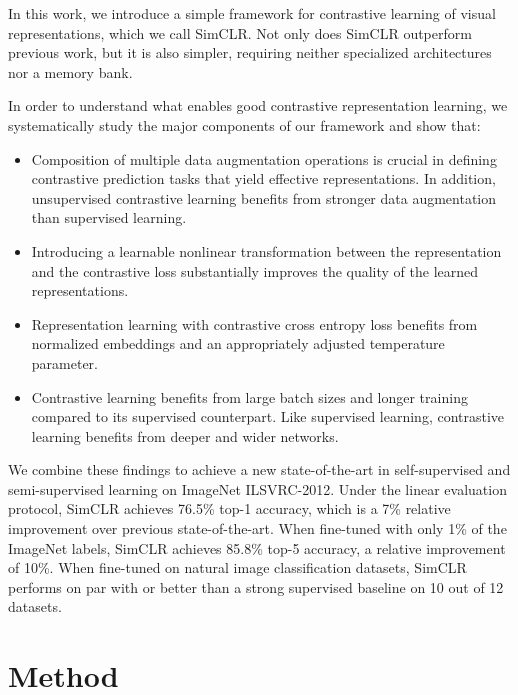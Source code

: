 \documentclass[conference]{IEEEtran}
\begin{document}
In this work, we introduce a simple framework for contrastive learning of visual representations, which we call SimCLR. Not only does SimCLR outperform previous work, but it is also simpler, requiring neither specialized architectures nor a memory bank.

In order to understand what enables good contrastive representation learning, we systematically study the major components of our framework and show that:
\begin{itemize}
    \item Composition of multiple data augmentation operations is crucial in defining contrastive prediction tasks that yield effective representations. In addition, unsupervised contrastive learning benefits from stronger data augmentation than supervised learning.
    \item Introducing a learnable nonlinear transformation between the representation and the contrastive loss substantially improves the quality of the learned representations.
    \item Representation learning with contrastive cross entropy loss benefits from normalized embeddings and an appropriately adjusted temperature parameter.
    \item Contrastive learning benefits from large batch sizes and longer training compared to its supervised counterpart. Like supervised learning, contrastive learning benefits from deeper and wider networks.
\end{itemize}

We combine these findings to achieve a new state-of-the-art in self-supervised and semi-supervised learning on ImageNet ILSVRC-2012. Under the linear evaluation protocol, SimCLR achieves 76.5\% top-1 accuracy, which is a 7\% relative improvement over previous state-of-the-art.
When fine-tuned with only 1\% of the ImageNet labels, SimCLR achieves 85.8\% top-5 accuracy, a relative improvement of 10\%. When fine-tuned on natural image classification datasets, SimCLR performs on par with or  better than a strong supervised baseline on 10 out of 12 datasets.

\section{Method}
\end{document}
